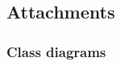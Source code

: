 \documentclass[12pt,a4paper,titlepage]{article}
\begin{document}

		\thispagestyle{empty}
		\tableofcontents
		\chapter{}
		\cleardoublepage

		\thispagestyle{empty}
		\listoffigures
		\clearpage
			
		\thispagestyle{empty}
		\listoftables
		\clearpage
		
\pagestyle{fancy}			




\clearpage

\clearpage 					%

\clearpage 					%

\clearpage

\clearpage


\clearpage
%

\section{Attachments}
\thispagestyle{plain}

\subsection{Class diagrams}
\label{sec:classDiagrams}
\end{document}
